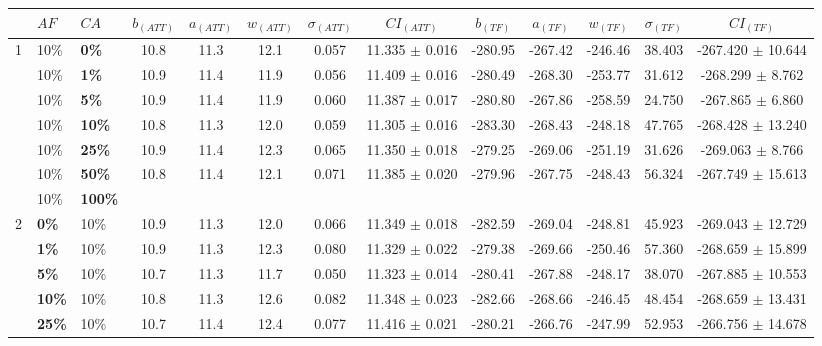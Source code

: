 \begin{sidewaystable}
    \hspace*{-0.5cm}
    \begin{tabular}{|l|l|l||c|c|c|c|c|c|c|c|c|c|}
    \hline
    ~ & $AF$ & $CA$ & $b_{(ATT)}$ & $a_{(ATT)}$ & $w_{(ATT)}$ & $\sigma_{(ATT)}$ & $CI_{(ATT)}$ & $b_{(TF)}$ & $a_{(TF)}$ & $w_{(TF)}$ & $\sigma_{(TF)}$ & $CI_{(TF)}$\\
    \hline
    1 & 10\% & \textbf{0\%} & 10.8 & 11.3 & 12.1 & 0.057 & 11.335 $\pm$ 0.016 & -280.95 & -267.42 & -246.46 & 38.403 & -267.420 $\pm$ 10.644\\
    ~ & 10\% & \textbf{1\%} & 10.9 & 11.4 & 11.9 & 0.056 & 11.409 $\pm$ 0.016 & -280.49 & -268.30 & -253.77 & 31.612 & -268.299 $\pm$ 8.762\\
    ~ & 10\% & \textbf{5\%} & 10.9 & 11.4 & 11.9 & 0.060 & 11.387 $\pm$ 0.017 & -280.80 & -267.86 & -258.59 & 24.750 & -267.865 $\pm$ 6.860\\
    ~ & 10\% & \textbf{10\%} & 10.8 & 11.3 & 12.0 & 0.059 & 11.305 $\pm$ 0.016 & -283.30 & -268.43 & -248.18 & 47.765 & -268.428 $\pm$ 13.240 \\
    ~ & 10\% & \textbf{25\%} & 10.9 & 11.4 & 12.3 & 0.065 & 11.350 $\pm$ 0.018 & -279.25 & -269.06 & -251.19 & 31.626 & -269.063 $\pm$ 8.766 \\
    ~ & 10\% & \textbf{50\%} & 10.8 & 11.4 & 12.1 & 0.071 & 11.385 $\pm$ 0.020 & -279.96 & -267.75 & -248.43 & 56.324 & -267.749 $\pm$ 15.613\\
    ~ & 10\% & \textbf{100\%} & ~ & ~ & ~ & ~ & ~ & ~ & ~ & ~ & ~ & ~ \\
    \hline
    2 & \textbf{0\%} & 10\% & 10.9 & 11.3 & 12.0 & 0.066 & 11.349 $\pm$ 0.018 & -282.59 & -269.04 & -248.81 & 45.923 & -269.043 $\pm$ 12.729 \\
    ~ & \textbf{1\%} & 10\% & 10.9 & 11.3 & 12.3 & 0.080 & 11.329 $\pm$ 0.022 & -279.38 & -269.66 & -250.46 & 57.360 & -268.659 $\pm$ 15.899 \\
    ~ & \textbf{5\%} & 10\% & 10.7 & 11.3 & 11.7 & 0.050 & 11.323 $\pm$ 0.014 & -280.41 & -267.88 & -248.17 & 38.070 & -267.885 $\pm$ 10.553 \\
    ~ & \textbf{10\%} & 10\% & 10.8 & 11.3 & 12.6 & 0.082 & 11.348 $\pm$ 0.023 & -282.66 & -268.66 & -246.45 & 48.454 & -268.659 $\pm$ 13.431 \\
    ~ & \textbf{25\%} & 10\% & 10.7 & 11.4 & 12.4 & 0.077 & 11.416 $\pm$ 0.021 & -280.21 & -266.76 & -247.99 & 52.953 & -266.756 $\pm$ 14.678 \\

\end{tabular}
\end{sidewaystable}
